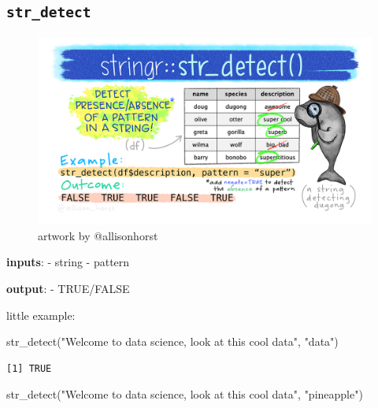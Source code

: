 \documentclass[
  letterpaper,
  DIV=11,
  numbers=noendperiod]{scrartcl}
\newenvironment{Shaded}{\begin{snugshade}}{\end{snugshade}}
\newcommand{\FunctionTok}[1]{\textcolor[rgb]{0.28,0.35,0.67}{#1}}
\newcommand{\NormalTok}[1]{\textcolor[rgb]{0.00,0.23,0.31}{#1}}
\newcommand{\StringTok}[1]{\textcolor[rgb]{0.13,0.47,0.30}{#1}}
\begin{document}
\hypertarget{str_detect}{%
\subsection{\texorpdfstring{\texttt{str\_detect}}{str\_detect}}\label{str_detect}}

\begin{figure}

{\centering \includegraphics{118_Q_stringr_files/mediabag/813129dc-25e9-4ea3-9.png}

}

\caption{artwork by @allisonhorst}

\end{figure}

\textbf{inputs}: - string - pattern

\textbf{output}: - TRUE/FALSE

little example:

\begin{Shaded}
\begin{Highlighting}[]
\FunctionTok{str\_detect}\NormalTok{(}\StringTok{"Welcome to data science, look at this cool data"}\NormalTok{, }\StringTok{"data"}\NormalTok{)}
\end{Highlighting}
\end{Shaded}

\begin{verbatim}
[1] TRUE
\end{verbatim}

\begin{Shaded}
\begin{Highlighting}[]
\FunctionTok{str\_detect}\NormalTok{(}\StringTok{"Welcome to data science, look at this cool data"}\NormalTok{, }\StringTok{"pineapple"}\NormalTok{)}
\end{Highlighting}
\end{Shaded}
\end{document}
